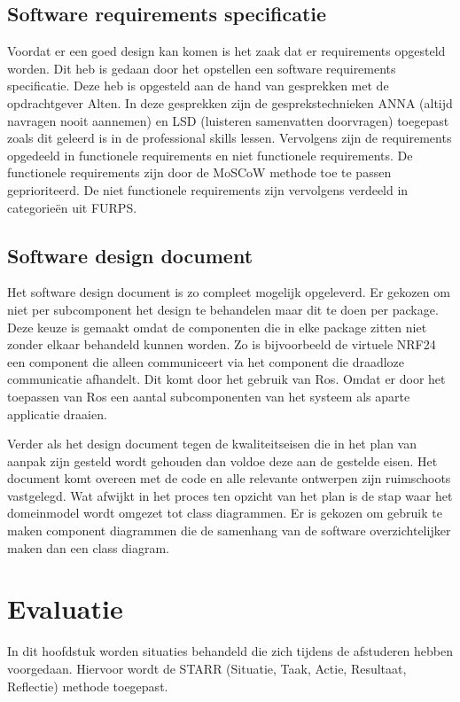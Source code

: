 \documentclass[a4paper, 11pt, oneside]{report}
\begin{document}
\section{Software requirements specificatie}\label{sec:software-requirements-specificatie}
Voordat er een goed design kan komen is het zaak dat er requirements opgesteld worden.
Dit heb is gedaan door het opstellen een software requirements specificatie.  
Deze heb is opgesteld aan de hand van gesprekken met de opdrachtgever Alten.
In deze gesprekken zijn de gesprekstechnieken ANNA (altijd navragen nooit aannemen) en LSD (luisteren samenvatten doorvragen) toegepast zoals dit geleerd is in de professional skills lessen.  
Vervolgens zijn de requirements opgedeeld in functionele requirements en niet functionele requirements. 
De functionele requirements zijn door de MoSCoW methode toe te passen geprioriteerd.
De niet functionele requirements zijn vervolgens verdeeld in categorieën uit FURPS. 

\section{Software design document}\label{sec:software-design-document}
Het software design document is zo compleet mogelijk opgeleverd.
Er gekozen om niet per subcomponent het design te behandelen maar dit te doen per package.
Deze keuze is gemaakt omdat de componenten die in elke package zitten niet zonder elkaar behandeld kunnen worden.
Zo is bijvoorbeeld de virtuele NRF24 een component die alleen communiceert via het component die draadloze communicatie afhandelt.
Dit komt door het gebruik van Ros.
Omdat er door het toepassen van Ros een aantal subcomponenten van het systeem als aparte applicatie draaien.

Verder als het design document tegen de kwaliteitseisen die in het plan van aanpak zijn gesteld wordt gehouden dan voldoe deze aan de gestelde eisen.
Het document komt overeen met de code en alle relevante ontwerpen zijn ruimschoots vastgelegd.
Wat afwijkt in het proces ten opzicht van het plan is de stap waar het domeinmodel wordt omgezet tot class diagrammen. 
Er is gekozen om gebruik te maken component diagrammen die de samenhang van de software overzichtelijker maken dan een class diagram. 


\chapter{Evaluatie}\label{sec:evaluatie}
In dit hoofdstuk worden situaties behandeld die zich tijdens de afstuderen hebben voorgedaan. 
Hiervoor wordt de STARR (Situatie, Taak, Actie, Resultaat, Reflectie) methode toegepast. 
\end{document}
